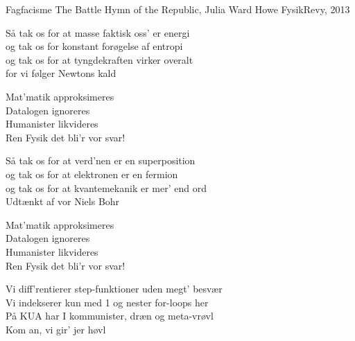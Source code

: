 \begin{song}{Fagfacisme}
  {} %
  {The Battle Hymn of the Republic, Julia Ward Howe} %
  {} %
  {FysikRevy, 2013} %
  {\NotCCLIed} %

  \begin{SBVerse}
    Så tak os for at masse faktisk oss' er energi\\
    og tak os for konstant forøgelse af entropi\\
    og tak os for at tyngdekraften virker overalt\\
    for vi følger Newtons kald
  \end{SBVerse}

  \begin{SBChorus}
    Mat'matik approksimeres\\
    Datalogen ignoreres\\
    Humanister likvideres\\
    Ren Fysik det bli'r vor svar!
  \end{SBChorus}

  \begin{SBVerse}
    Så tak os for at verd'nen er en superposition\\
    og tak os for at elektronen er en fermion\\
    og tak os for at kvantemekanik er mer' end ord\\
    Udtænkt af vor Niels Bohr
  \end{SBVerse}

  \begin{SBChorus}
    Mat'matik approksimeres\\
    Datalogen ignoreres\\
    Humanister likvideres\\
    Ren Fysik det bli'r vor svar!
  \end{SBChorus}

  \begin{SBVerse}
    Vi diff'rentierer step-funktioner uden megt' besvær\\
    Vi indekserer kun med 1 og nester for-loops her\\
    På KUA har I kommunister, dræn og meta-vrøvl\\
    Kom an, vi gir' jer høvl
  \end{SBVerse}


\end{song}
